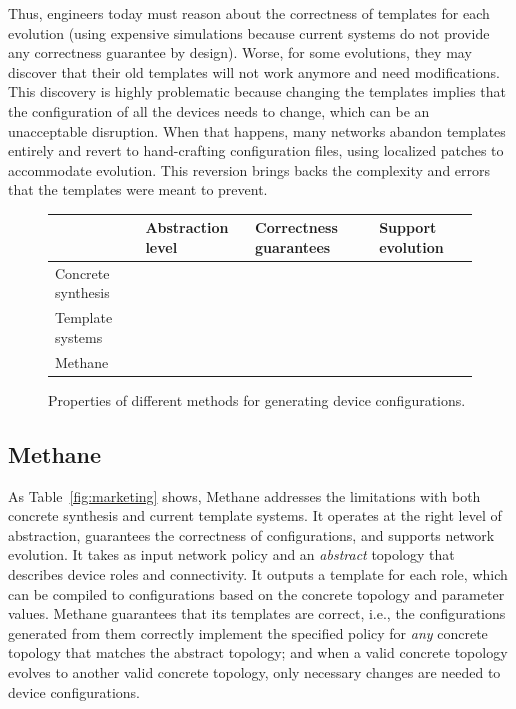 \documentclass{sig-alternate-10pt}
\newcommand{\cmark}{\ding{51}}
\newcommand{\xmark}{\ding{55}}
\newcommand{\sysname}{{\small \sf Methane}\xspace}
\newcommand{\sysnamesec}{{\sf Methane}\xspace}
\begin{document}
Thus, engineers today must reason about the correctness of templates for each evolution (using expensive simulations because current systems do not provide any correctness guarantee by design). Worse, for some evolutions, they may discover that their old templates will not work anymore and need modifications. This discovery is highly problematic because changing the templates implies that the configuration of all the devices needs to change, which can be an unacceptable disruption.  When that happens, many networks abandon templates entirely and revert to hand-crafting configuration files, using localized patches to accommodate evolution. This reversion brings backs the complexity and errors that the templates were meant to prevent.


\begin{figure}
\begin{tabular}{p{0.7in}|p{0.7in}p{0.7in}p{0.7in}}
& Abstraction level & Correctness guarantees & Support evolution  \\ \hline
Concrete synthesis & \xmark & \cmark & \xmark \\ \hline
Template systems & \cmark & \xmark & \xmark \\ \hline
\sysname & \cmark & \cmark & \cmark \\ 
\end{tabular}
\caption{Properties of different methods for generating device configurations.}
\end{figure}


\subsection{\sysnamesec}

As Table~\ref{fig:marketing} shows, \sysname addresses the limitations with both concrete synthesis and current template systems. It operates at the right level of abstraction, guarantees the correctness of configurations, and supports network evolution. It takes as input network policy and an {\em abstract} topology  that describes device roles and connectivity. It outputs a template for each role, which can be compiled to configurations based on the concrete topology and parameter values. \sysname guarantees that its templates are correct, i.e., the configurations generated from them correctly implement the specified policy for {\em any} concrete topology that matches the abstract topology; and when a valid concrete topology evolves to another valid concrete topology, only necessary changes are needed to device configurations.
\end{document}
